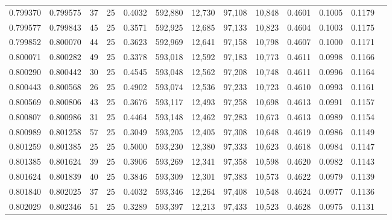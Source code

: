 \begin{tabular}{rrrrrrrrrrrrr}
0.799370 & 0.799575 &    37 &  25 &                                     0.4032 & 592,880 &  12,730 &  97,108 &  10,848 & 0.4601 & 0.1005 & 0.1179 \\
0.799577 & 0.799843 &    45 &  25 &                                     0.3571 & 592,925 &  12,685 &  97,133 &  10,823 & 0.4604 & 0.1003 & 0.1175 \\
0.799852 & 0.800070 &    44 &  25 &                                     0.3623 & 592,969 &  12,641 &  97,158 &  10,798 & 0.4607 & 0.1000 & 0.1171 \\
0.800071 & 0.800282 &    49 &  25 &                                     0.3378 & 593,018 &  12,592 &  97,183 &  10,773 & 0.4611 & 0.0998 & 0.1166 \\
0.800290 & 0.800442 &    30 &  25 &                                     0.4545 & 593,048 &  12,562 &  97,208 &  10,748 & 0.4611 & 0.0996 & 0.1164 \\
0.800443 & 0.800568 &    26 &  25 &                                     0.4902 & 593,074 &  12,536 &  97,233 &  10,723 & 0.4610 & 0.0993 & 0.1161 \\
0.800569 & 0.800806 &    43 &  25 &                                     0.3676 & 593,117 &  12,493 &  97,258 &  10,698 & 0.4613 & 0.0991 & 0.1157 \\
0.800807 & 0.800986 &    31 &  25 &                                     0.4464 & 593,148 &  12,462 &  97,283 &  10,673 & 0.4613 & 0.0989 & 0.1154 \\
0.800989 & 0.801258 &    57 &  25 &                                     0.3049 & 593,205 &  12,405 &  97,308 &  10,648 & 0.4619 & 0.0986 & 0.1149 \\
0.801259 & 0.801385 &    25 &  25 &                                     0.5000 & 593,230 &  12,380 &  97,333 &  10,623 & 0.4618 & 0.0984 & 0.1147 \\
0.801385 & 0.801624 &    39 &  25 &                                     0.3906 & 593,269 &  12,341 &  97,358 &  10,598 & 0.4620 & 0.0982 & 0.1143 \\
0.801624 & 0.801839 &    40 &  25 &                                     0.3846 & 593,309 &  12,301 &  97,383 &  10,573 & 0.4622 & 0.0979 & 0.1139 \\
0.801840 & 0.802025 &    37 &  25 &                                     0.4032 & 593,346 &  12,264 &  97,408 &  10,548 & 0.4624 & 0.0977 & 0.1136 \\
0.802029 & 0.802346 &    51 &  25 &                                     0.3289 & 593,397 &  12,213 &  97,433 &  10,523 & 0.4628 & 0.0975 & 0.1131 \\

\end{tabular}
